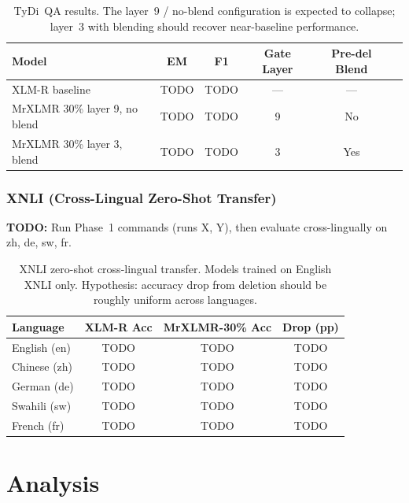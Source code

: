 \documentclass[11pt,a4paper]{article}
\newcommand{\todo}[1]{\begin{mdframed}[style=todostyle]\textcolor{todocolor}{\textbf{TODO:}} #1\end{mdframed}}
\begin{document}
\begin{table}[h]
\centering
\begin{tabular}{@{}lccccc@{}}
\toprule
\textbf{Model} & \textbf{EM} & \textbf{F1} & \textbf{Gate Layer} & \textbf{Pre-del Blend} \\
\midrule
XLM-R baseline                      & TODO & TODO & --- & --- \\
MrXLMR 30\% layer 9, no blend       & TODO & TODO & 9   & No  \\
MrXLMR 30\% layer 3, blend          & TODO & TODO & 3   & Yes \\
\bottomrule
\end{tabular}
\caption{TyDi~QA results. The layer~9 / no-blend configuration is expected to collapse; layer~3 with blending should recover near-baseline performance.}
\label{tab:tydiqa-results}
\end{table}

\subsubsection{XNLI (Cross-Lingual Zero-Shot Transfer)}

\todo{Run Phase~1 commands (runs X, Y), then evaluate cross-lingually on zh, de, sw, fr.}

\begin{table}[h]
\centering
\begin{tabular}{@{}lccc@{}}
\toprule
\textbf{Language} & \textbf{XLM-R Acc} & \textbf{MrXLMR-30\% Acc} & \textbf{Drop (pp)} \\
\midrule
English (en) & TODO & TODO & TODO \\
Chinese (zh) & TODO & TODO & TODO \\
German (de)  & TODO & TODO & TODO \\
Swahili (sw) & TODO & TODO & TODO \\
French (fr)  & TODO & TODO & TODO \\
\bottomrule
\end{tabular}
\caption{XNLI zero-shot cross-lingual transfer. Models trained on English XNLI only. Hypothesis: accuracy drop from deletion should be roughly uniform across languages.}
\label{tab:xnli-results}
\end{table}


\section{Analysis}
\label{sec:analysis}
\end{document}
